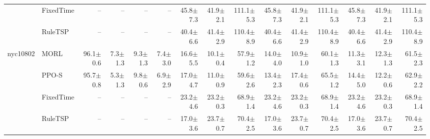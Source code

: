 \begin{table}
{\begin{tabular}{llrrrr|rrr|rrr|rrr}
 & FixedTime & -- & -- & -- & -- & 45.8$\pm$7.3 & 41.9$\pm$2.1 & 111.1$\pm$5.3 & 45.8$\pm$7.3 & 41.9$\pm$2.1 & 111.1$\pm$5.3 & 45.8$\pm$7.3 & 41.9$\pm$2.1 & 111.1$\pm$5.3 \\
 & RuleTSP & -- & -- & -- & -- & 40.4$\pm$6.6 & 41.4$\pm$2.9 & 110.4$\pm$8.9 & 40.4$\pm$6.6 & 41.4$\pm$2.9 & 110.4$\pm$8.9 & 40.4$\pm$6.6 & 41.4$\pm$2.9 & 110.4$\pm$8.9 \\
\addlinespace
nyc10802 & MORL & 96.1$\pm$0.6 & 7.3$\pm$1.3 & 9.3$\pm$1.3 & 7.4$\pm$3.0 & 16.6$\pm$5.5 & 10.1$\pm$0.4 & 57.9$\pm$1.2 & 14.0$\pm$4.0 & 10.9$\pm$1.0 & 60.1$\pm$1.3 & 11.3$\pm$3.1 & 12.3$\pm$1.3 & 61.5$\pm$2.3 \\
 & PPO-S & 95.7$\pm$0.8 & 5.3$\pm$1.3 & 9.8$\pm$0.6 & 6.9$\pm$2.9 & 17.0$\pm$4.7 & 11.0$\pm$0.9 & 59.6$\pm$2.6 & 13.4$\pm$2.3 & 17.4$\pm$0.6 & 65.5$\pm$1.2 & 14.4$\pm$5.0 & 12.2$\pm$0.6 & 62.9$\pm$2.2 \\
 & FixedTime & -- & -- & -- & -- & 23.2$\pm$4.6 & 23.2$\pm$0.3 & 68.9$\pm$1.4 & 23.2$\pm$4.6 & 23.2$\pm$0.3 & 68.9$\pm$1.4 & 23.2$\pm$4.6 & 23.2$\pm$0.3 & 68.9$\pm$1.4 \\
 & RuleTSP & -- & -- & -- & -- & 17.0$\pm$3.6 & 23.7$\pm$0.7 & 70.4$\pm$2.5 & 17.0$\pm$3.6 & 23.7$\pm$0.7 & 70.4$\pm$2.5 & 17.0$\pm$3.6 & 23.7$\pm$0.7 & 70.4$\pm$2.5 \\
\bottomrule
\end{tabular}}
\end{table}
